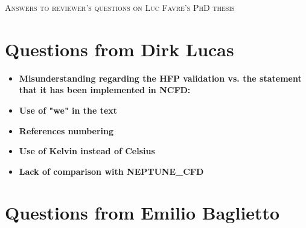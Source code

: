 \documentclass[8pt, a4paper]{article}
\newcommand{\npar}{\vspace{\baselineskip}}
\begin{document}
{\centering

\Large{\textsc{Answers to reviewer's questions on Luc Favre's PhD thesis}}

}


\npar

\section{Questions from Dirk Lucas}

\begin{itemize}
\setlength{\itemsep}{20pt}
\item \textbf{Misunderstanding regarding the HFP validation vs. the statement that it has been implemented in NCFD:}

\item \textbf{Use of "we" in the text}


\item \textbf{References numbering}

\item \textbf{Use of Kelvin instead of Celsius}

\item \textbf{Lack of comparison with NEPTUNE\_CFD}

\end{itemize}


\clearpage

\section{Questions from Emilio Baglietto}
\end{document}
